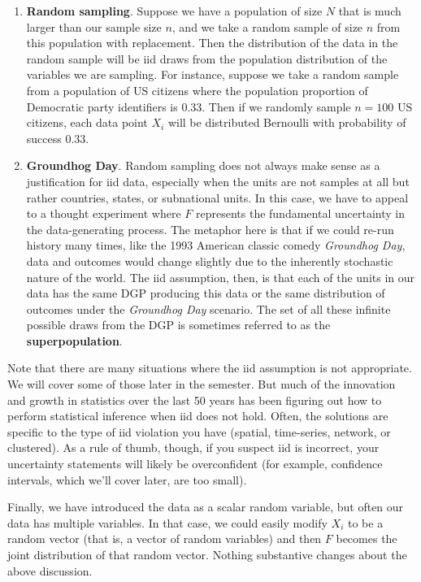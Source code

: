 \documentclass[
  letterpaper,
  DIV=11,
  numbers=noendperiod]{scrreprt}
\providecommand{\tightlist}{%
  \setlength{\itemsep}{0pt}\setlength{\parskip}{0pt}}\usepackage{longtable,booktabs,array}
\theoremstyle{definition}
\theoremstyle{definition}
\theoremstyle{plain}
\theoremstyle{remark}
\begin{document}
\begin{enumerate}
\def\labelenumi{\arabic{enumi}.}
\tightlist
\item
  \textbf{Random sampling}. Suppose we have a population of size \(N\)
  that is much larger than our sample size \(n\), and we take a random
  sample of size \(n\) from this population with replacement. Then the
  distribution of the data in the random sample will be iid draws from
  the population distribution of the variables we are sampling. For
  instance, suppose we take a random sample from a population of US
  citizens where the population proportion of Democratic party
  identifiers is 0.33. Then if we randomly sample \(n = 100\) US
  citizens, each data point \(X_i\) will be distributed Bernoulli with
  probability of success 0.33.
\item
  \textbf{Groundhog Day}. Random sampling does not always make sense as
  a justification for iid data, especially when the units are not
  samples at all but rather countries, states, or subnational units. In
  this case, we have to appeal to a thought experiment where \(F\)
  represents the fundamental uncertainty in the data-generating process.
  The metaphor here is that if we could re-run history many times, like
  the 1993 American classic comedy \emph{Groundhog Day}, data and
  outcomes would change slightly due to the inherently stochastic nature
  of the world. The iid assumption, then, is that each of the units in
  our data has the same DGP producing this data or the same distribution
  of outcomes under the \emph{Groundhog Day} scenario. The set of all
  these infinite possible draws from the DGP is sometimes referred to as
  the \textbf{superpopulation}.
\end{enumerate}

Note that there are many situations where the iid assumption is not
appropriate. We will cover some of those later in the semester. But much
of the innovation and growth in statistics over the last 50 years has
been figuring out how to perform statistical inference when iid does not
hold. Often, the solutions are specific to the type of iid violation you
have (spatial, time-series, network, or clustered). As a rule of thumb,
though, if you suspect iid is incorrect, your uncertainty statements
will likely be overconfident (for example, confidence intervals, which
we'll cover later, are too small).

Finally, we have introduced the data as a scalar random variable, but
often our data has multiple variables. In that case, we could easily
modify \(X_i\) to be a random vector (that is, a vector of random
variables) and then \(F\) becomes the joint distribution of that random
vector. Nothing substantive changes about the above discussion.
\end{document}
